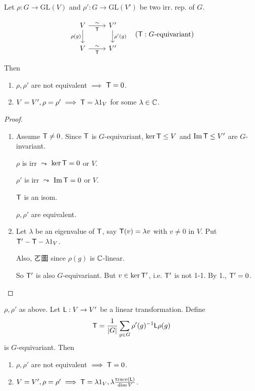 \begin{lemma}
  Let $\rho: G \to \text{GL}(V)$ and $\rho': G\to \text{GL}(V')$ be two irr.
  rep. of $G$.
  
  \[
    \begin{tikzcd}
      V \arrow[d, "\rho(g)"'] \arrow[r, "{\sf T}"', "\sim"] & V' \arrow[d, "\rho'(g)"] \\
      V \arrow[r, "{\sf T}"', "\sim"] & V'
    \end{tikzcd}
    \quad ({\sf T}: G\text{-equivariant})
  \]

  Then
  \begin{enumerate}
    \item $\rho, \rho'$ are not equivalent $\implies$ ${\sf T} = 0$.
    \item $V = V', \rho = \rho' \implies {\sf T} = \lambda 1_V$ for some
      $\lambda \in \mathbb{C}$.
  \end{enumerate}

  \begin{proof} \mbox{}
    \begin{enumerate}
      \item Assume ${\sf T} \ne 0$. Since ${\sf T}$ is $G$-equivariant,
        $\ker {\sf T} \le V$ and $\operatorname{Im} {\sf T}\le V'$ are $G$-invariant.

        $\rho$ is irr $\leadsto$ $\ker {\sf T} = 0$ or $V$.

        $\rho'$ is irr $\leadsto$ $\operatorname{Im} {\sf T} = 0$ or $V$.

        ${\sf T}$ is an isom.

        $\rho, \rho'$ are equivalent.

      \item  Let $\lambda$ be an eigenvalue of ${\sf T}$, say
        ${\sf T}(v) = \lambda v$ with $v \ne 0$ in $V$.
        Put ${\sf T}' - {\sf T} - \lambda 1_V$.

        Also, ㄛ圖 since $\rho(g)$ is $\mathbb{C}$-linear.

        So ${\sf T}'$ is also $G$-equivariant. But $v \in \ker {\sf T}'$,
        i.e. ${\sf T}'$ is not 1-1. By 1., ${\sf T'} = 0$.
    \end{enumerate}
  \end{proof}
\end{lemma}

\begin{coro}
  $\rho, \rho'$ as above. Let ${\sf L}: V \to V'$ be a linear transformation.
  Define
  \[
    {\sf T} = \frac{1}{\lvert G\rvert} \sum_{g\in G} \rho'(g)^{-1} {\sf L} \rho(g)
  \]
  is $G$-equivariant. Then
  \begin{enumerate}
    \item $\rho, \rho'$ are not equivalent $\implies {\sf T} = 0$.
    \item $V = V', \rho = \rho' \implies {\sf T} = \lambda 1_V,
      \lambda \frac{\operatorname{trace}({\sf L})}{\dim V}$.
  \end{enumerate}
\end{coro}

